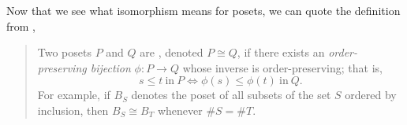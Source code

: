 Now that we see what isomorphism means for posets, we can quote the definition
from \cite{Stanley:2011:ECV:2124415},

\begin{quotation}

Two posets $P$ and $Q$ are , denoted $P \cong Q$, if
there exists an \emph{order-preserving bijection} $\phi : P \to Q$ whose
inverse is order-preserving; that is, $$s \leq t~\text{in}~P \iff \phi(s) \leq
\phi(t)~\text{in}~Q.$$ For example, if $B_S$ denotes the poset of all subsets
of the set $S$ ordered by inclusion, then $B_S \cong B_T$ whenever $\#S = \#T$.

\end{quotation}
